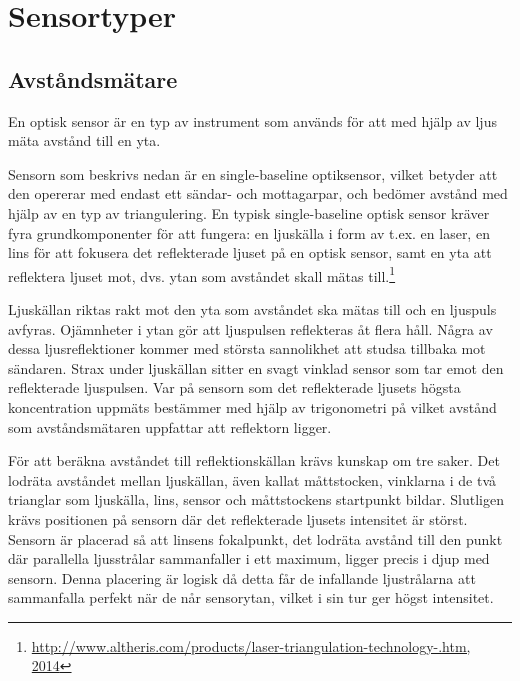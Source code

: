 \documentclass[a4paper,12pt,fleqn]{article}
\begin{document}
\section{Sensortyper}

\subsection{Avståndsmätare}
En optisk sensor är en typ av instrument som används för att med hjälp av ljus mäta avstånd till en yta.

Sensorn som beskrivs nedan är en single-baseline optiksensor, vilket betyder att den opererar med endast ett sändar- och mottagarpar, och bedömer avstånd med hjälp av en typ av triangulering.
En typisk single-baseline optisk sensor kräver fyra grundkomponenter för att fungera:
en ljuskälla i form av t.ex. en laser, en lins för att fokusera det reflekterade ljuset på 
en optisk sensor, samt en yta att reflektera ljuset mot, dvs. ytan som avståndet skall mätas till.\footnote{\url{http://www.altheris.com/products/laser-triangulation-technology-.htm, 2014}}

Ljuskällan riktas rakt mot den yta som avståndet ska mätas till och en ljuspuls avfyras. Ojämnheter i ytan gör att ljuspulsen reflekteras åt flera håll. Några av dessa ljusreflektioner kommer med största sannolikhet att studsa tillbaka mot sändaren.
Strax under ljuskällan sitter en svagt vinklad sensor som tar emot den reflekterade ljuspulsen.  Var på sensorn som det reflekterade ljusets högsta koncentration uppmäts bestämmer med hjälp av trigonometri på vilket avstånd som avståndsmätaren uppfattar att reflektorn ligger.

För att beräkna avståndet till reflektionskällan krävs kunskap om tre saker.
Det lodräta avståndet mellan ljuskällan, även kallat måttstocken, vinklarna i de två trianglar som ljuskälla, lins, sensor och måttstockens startpunkt bildar. Slutligen krävs positionen på sensorn där det reflekterade ljusets intensitet är störst. Sensorn är placerad så att linsens fokalpunkt, det lodräta avstånd till den punkt där parallella ljusstrålar sammanfaller i ett maximum, ligger precis i djup med sensorn. Denna placering är logisk då detta får de infallande ljustrålarna att sammanfalla perfekt när de når sensorytan, vilket i sin tur ger högst intensitet.
\end{document}
